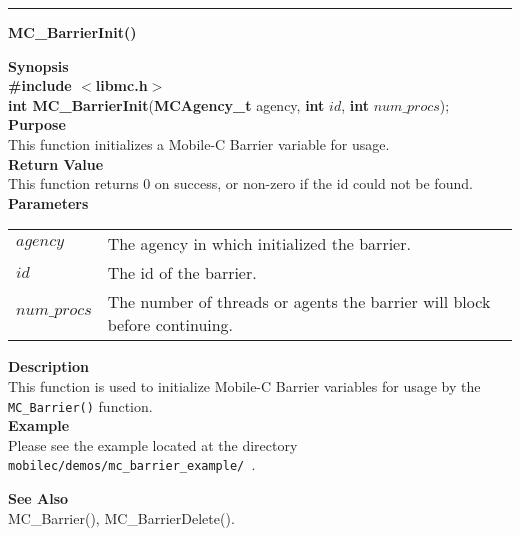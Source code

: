 \noindent
\vspace{5pt}
\rule{6.5in}{0.015in}
\noindent
{}
{\LARGE \bf MC\_BarrierInit()}\\
\label{api:MC_BarrierInit()}

\noindent
{\bf Synopsis}\\
{\bf \#include $<$libmc.h$>$}\\
{\bf int MC\_BarrierInit}({\bf MCAgency\_t} agency, {\bf int} $id$, {\bf int} $num\_procs$);\\

\noindent
{\bf Purpose}\\
This function initializes a Mobile-C Barrier variable for usage. \\

\noindent
{\bf Return Value}\\
This function returns 0 on success, or non-zero if the id could not be found. \\

\noindent
{\bf Parameters}
\vspace{-0.1pt}
\begin{description}
\item
\begin{tabular}{p{20 mm}p{145 mm}} 
$agency$ & The agency in which initialized the barrier.\\
$id$ & The id of the barrier. \\
$num\_procs$ & The number of threads or agents the barrier will block before
  continuing.
\end{tabular}
\end{description}

\noindent
{\bf Description}\\
This function is used to initialize Mobile-C Barrier variables for usage
by the \texttt{MC\_Barrier()} function. 
    \\

\noindent
{\bf Example}\\
Please see the example located at the directory
\texttt{ mobilec/demos/mc\_barrier\_example/ }. \\

\noindent

\noindent
{\bf See Also}\\
MC\_Barrier(), MC\_BarrierDelete(). \\

